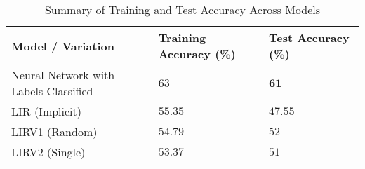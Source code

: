 \documentclass[a4paper, 12pt]{report}
\begin{document}
\begin{table}[H]
    \centering
    \caption{Summary of Training and Test Accuracy Across Models}
    \label{tab:summary_accuracy_all_models_accuracy_exp6}
    \small
    \begin{tabular}{|l|l|l|}
    \toprule
    \textbf{Model / Variation} & \textbf{Training Accuracy (\%)} & \textbf{Test Accuracy (\%)} \\
    \midrule
    Neural Network with Labels Classified & $63$ & $\mathbf{61}$ \\
    LIR (Implicit) & $55.35$ & $47.55$ \\
    LIRV1 (Random) & $54.79$ & $52$ \\
    LIRV2 (Single) & $53.37$ & $51$ \\
    \bottomrule
    \end{tabular}
\end{table}
\clearpage
\end{document}
